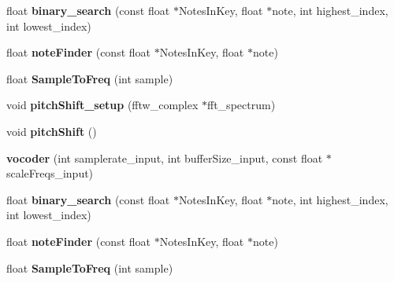 \begin{DoxyCompactItemize}
\item 
\hypertarget{classvocoder_a7a0b1f788e03878de287d7f6163208a9}{float {\bfseries binary\-\_\-search} (const float $\ast$Notes\-In\-Key, float $\ast$note, int highest\-\_\-index, int lowest\-\_\-index)}\label{classvocoder_a7a0b1f788e03878de287d7f6163208a9}

\item 
\hypertarget{classvocoder_afb731a113935c575939ebdff7ae37580}{float {\bfseries note\-Finder} (const float $\ast$Notes\-In\-Key, float $\ast$note)}\label{classvocoder_afb731a113935c575939ebdff7ae37580}

\item 
\hypertarget{classvocoder_a2b3a6e386d3a18f9366320e5743d33b1}{float {\bfseries Sample\-To\-Freq} (int sample)}\label{classvocoder_a2b3a6e386d3a18f9366320e5743d33b1}

\item 
\hypertarget{classvocoder_aa3d122aee6d6ae77ac5b04572e924dc0}{void {\bfseries pitch\-Shift\-\_\-setup} (fftw\-\_\-complex $\ast$fft\-\_\-spectrum)}\label{classvocoder_aa3d122aee6d6ae77ac5b04572e924dc0}

\item 
\hypertarget{classvocoder_aa218678a51da7429066c32e59edd5057}{void {\bfseries pitch\-Shift} ()}\label{classvocoder_aa218678a51da7429066c32e59edd5057}

\item 
\hypertarget{classvocoder_a5e51f2bff73fdb41cb326e0743170b15}{{\bfseries vocoder} (int samplerate\-\_\-input, int buffer\-Size\-\_\-input, const float $\ast$scale\-Freqs\-\_\-input)}\label{classvocoder_a5e51f2bff73fdb41cb326e0743170b15}

\item 
\hypertarget{classvocoder_a7a0b1f788e03878de287d7f6163208a9}{float {\bfseries binary\-\_\-search} (const float $\ast$Notes\-In\-Key, float $\ast$note, int highest\-\_\-index, int lowest\-\_\-index)}\label{classvocoder_a7a0b1f788e03878de287d7f6163208a9}

\item 
\hypertarget{classvocoder_afb731a113935c575939ebdff7ae37580}{float {\bfseries note\-Finder} (const float $\ast$Notes\-In\-Key, float $\ast$note)}\label{classvocoder_afb731a113935c575939ebdff7ae37580}

\item 
\hypertarget{classvocoder_a2b3a6e386d3a18f9366320e5743d33b1}{float {\bfseries Sample\-To\-Freq} (int sample)}\label{classvocoder_a2b3a6e386d3a18f9366320e5743d33b1}


\end{DoxyCompactItemize}
